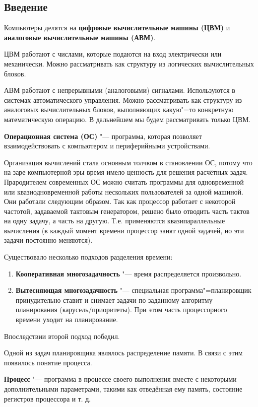 \subsection{Введение}

Компьютеры делятся на \textbf{цифровые вычислительные машины (ЦВМ)} и \textbf{аналоговые вычислительные машины (АВМ)}.

ЦВМ работают с числами, которые подаются на вход электрически или механически. Можно рассматривать как структуру из логических вычислительных блоков.

АВМ работают с непрерывными (аналоговыми) сигналами. Используются в системах автоматического управления. Можно рассматривать как структуру из аналоговых вычислительных блоков, выполняющих какую"=то конкретную математическую операцию. В дальнейшем мы будем рассматривать только ЦВМ.

\textbf{Операционная система (ОС)} "--- программа, которая позволяет взаимодействовать с компьютером и периферийными устройствами.

Организация вычислений стала основным толчком в становлении ОС, потому что на заре компьютерной эры время имело ценность для решения расчётных задач. Прародителем современных ОС можно считать программы для одновременной или квазиодновременной работы нескольких пользователей за одной машиной. Они работали следующим образом. Так как процессор работает с некоторой частотой, задаваемой тактовым генератором, решено было отводить часть тактов на одну задачу, а часть на другую. Т.е. применяются квазипараллельные вычисления (в каждый момент времени процессор занят одной задачей, но эти задачи постоянно меняются).

Существовало несколько подходов разделения времени:
\begin{enumerate}
    \item \textbf{Кооперативная многозадачность} "--- время распределяется произвольно.
    \item \textbf{Вытесняющая многозадачность} "--- специальная программа"=планировщик принудительно ставит и снимает задачи по заданному алгоритму планирования (карусель/приоритеты). При этом часть процессорного времени уходит на планирование.
\end{enumerate}

Впоследствии второй подход победил.

Одной из задач планировщика являлось распределение памяти. В связи с этим появилось понятие процесса.

\textbf{Процесс} "--- программа в процессе своего выполнения вместе с некоторыми дополнительными параметрами, такими как отведённая ему память, состояние регистров процессора и т. д.

